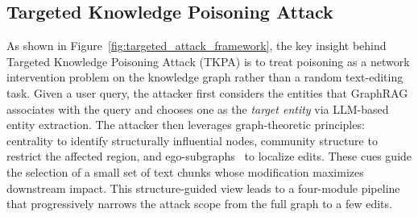 \documentclass[letterpaper]{article} %
\begin{document}






\subsection{Targeted Knowledge Poisoning Attack}
As shown in Figure~\ref{fig:targeted_attack_framework}, 
the key insight behind Targeted Knowledge Poisoning Attack (TKPA) is to treat poisoning as a network intervention problem on the knowledge graph rather than a random text-editing task.
Given a user query, the attacker first considers the entities that GraphRAG associates with the query and chooses one as the \emph{target entity} via LLM-based entity extraction.
The attacker then leverages graph-theoretic principles: centrality to identify structurally influential nodes, community structure to restrict the affected region, 
and ego-subgraphs~\cite{mitchell1969social,DBLP:journals/intr/WangW25} to localize edits. 
These cues guide the selection of a small set of text chunks whose modification maximizes downstream impact.
This structure-guided view leads to a four-module pipeline that progressively narrows the attack scope from the full graph to a few edits.
\end{document}
